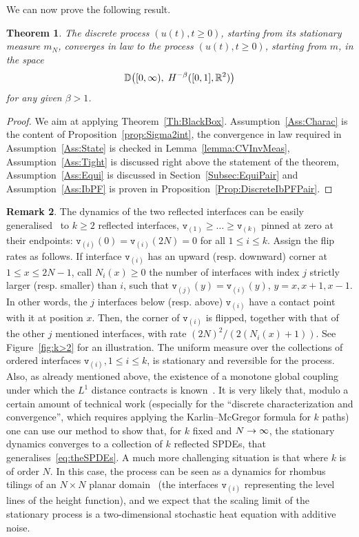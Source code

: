 \documentclass[10pt]{amsart}
\newtheorem{theo}{Theorem}[section]
\theoremstyle{definition}\newtheorem{defi}[theo]{Definition}\newtheorem{rema}[theo]{Remark}\newtheorem{exam}[theo]{Example}\newtheorem{exem}[theo]{Example}\newtheorem{nota}[theo]{Notation}
\theoremstyle{plain}
\newcommand{\ttv}{\mathtt{v}}
\newcommand{\bbD}{\mathbb{D}}
\newcommand{\R}{\mathbb{R}}
\let\originalleft\left
\let\originalright\right
\renewcommand{\left}{\mathopen{}\mathclose\bgroup\originalleft}
\renewcommand{\right}{\aftergroup\egroup\originalright}
\renewcommand*{\to}{\mathchoice{\longrightarrow}{\rightarrow}{\rightarrow}{\rightarrow}}
\begin{document}
We can now prove the following result.

\begin{theo}\label{Th:Pair}
The discrete process $(u(t), t\ge 0)$, starting from its stationary measure $m_N$, converges in law to the process $(u(t),t\ge 0)$, starting from $m$, in the space
\[
\bbD\left([0,\infty),\;H^{-\beta}([0,1], \R^2)\right)
\]
for any given $\beta > 1$.
\end{theo}
\begin{proof}
We aim at applying Theorem~\ref{Th:BlackBox}. Assumption~\ref{Ass:Charac} is the content of Proposition~\ref{prop:Sigma2int}, the convergence in law required in Assumption~\ref{Ass:State} is checked in Lemma~\ref{lemma:CVInvMeas}, Assumption~\ref{Ass:Tight} is discussed right above the statement of the theorem, Assumption~\ref{Ass:Equi} is discussed in Section~\ref{Subsec:EquiPair} and Assumption~\ref{Ass:IbPF} is proven in Proposition~\ref{Prop:DiscreteIbPFPair}.
\end{proof}


\begin{rema}\label{rem:k>2}
The dynamics of the two reflected
interfaces can be easily generalised~\cite{luby2001markov,wilson2004mixing} to $k\ge 2$ reflected interfaces, $\ttv_{(1)}\ge \dots\ge \ttv_{(k)}$ pinned at zero at their endpoints: $\ttv_{(i)}(0)=\ttv_{(i)}(2N)=0$ for all $1\le i\le k$. Assign the flip rates as follows. If interface $\ttv_{(i)}$ has an upward (resp. downward) corner at $1\le x\le 2N-1$, call $N_i(x)\ge0$ the number of interfaces with index $j$ strictly larger (resp. smaller) than $i$, such that $\ttv_{(j)}(y)=\ttv_{(i)}(y)$, $y=x,x+1,x-1$. In other words, the $j$ interfaces below (resp. above) $\ttv_{(i)}$ have a contact point with it at position $x$. Then, the corner of $\ttv_{(i)}$ is flipped, together with that of the other $j$ mentioned interfaces, with rate $(2N)^2/(2 (N_i(x)+1))$. See Figure~\ref{fig:k>2} for an illustration. The uniform measure over the collections of ordered interfaces $\ttv_{(i)},1\le i\le k$, is stationary and reversible for the process. Also, as already mentioned above, the existence of a monotone global coupling under which the $L^1$ distance contracts is known~\cite{wilson2004mixing}. It is very likely that, modulo a certain amount of technical work (especially for the ``discrete characterization and convergence'', which requires applying the Karlin--McGregor formula for $k$ paths) one can use our method to show that, for $k$ fixed and $N\to\infty$, the stationary dynamics converges to a collection of $k$ reflected SPDEs, that generalises~\eqref{eq:theSPDEs}. A much more challenging situation is that where $k$ is of order $N$. In this case, the process can be seen as a dynamics for rhombus tilings of an $N\times N$ planar domain~\cite{wilson2004mixing} (the interfaces $\ttv_{(i)}$ representing the level lines of the height function), and we expect that the scaling limit of the stationary process is a two-dimensional stochastic heat equation with additive noise.
\end{rema}
\end{document}
